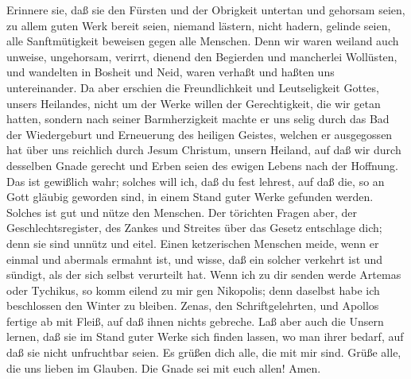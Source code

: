  Erinnere sie, daß sie den Fürsten und der Obrigkeit
untertan und gehorsam seien, zu allem guten Werk bereit seien,
 niemand lästern, nicht hadern, gelinde seien, alle
Sanftmütigkeit beweisen gegen alle Menschen.  Denn wir waren
weiland auch unweise, ungehorsam, verirrt, dienend den Begierden und
mancherlei Wollüsten, und wandelten in Bosheit und Neid, waren verhaßt
und haßten uns untereinander.  Da aber erschien die
Freundlichkeit und Leutseligkeit Gottes, unsers Heilandes, 
nicht um der Werke willen der Gerechtigkeit, die wir getan hatten,
sondern nach seiner Barmherzigkeit machte er uns selig durch das Bad der
Wiedergeburt und Erneuerung des heiligen Geistes,  welchen
er ausgegossen hat über uns reichlich durch Jesum Christum, unsern
Heiland,  auf daß wir durch desselben Gnade gerecht und
Erben seien des ewigen Lebens nach der Hoffnung.  Das ist
gewißlich wahr; solches will ich, daß du fest lehrest, auf daß die, so
an Gott gläubig geworden sind, in einem Stand guter Werke gefunden
werden. Solches ist gut und nütze den Menschen.  Der
törichten Fragen aber, der Geschlechtsregister, des Zankes und Streites
über das Gesetz entschlage dich; denn sie sind unnütz und eitel.
 Einen ketzerischen Menschen meide, wenn er einmal und
abermals ermahnt ist,  und wisse, daß ein solcher verkehrt
ist und sündigt, als der sich selbst verurteilt hat.  Wenn
ich zu dir senden werde Artemas oder Tychikus, so komm eilend zu mir gen
Nikopolis; denn daselbst habe ich beschlossen den Winter zu bleiben.
 Zenas, den Schriftgelehrten, und Apollos fertige ab mit
Fleiß, auf daß ihnen nichts gebreche.  Laß aber auch die
Unsern lernen, daß sie im Stand guter Werke sich finden lassen, wo man
ihrer bedarf, auf daß sie nicht unfruchtbar seien.  Es
grüßen dich alle, die mit mir sind. Grüße alle, die uns lieben im
Glauben. Die Gnade sei mit euch allen! Amen.
